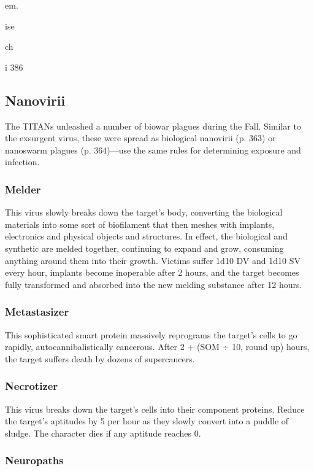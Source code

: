 em. 

ise

ch 

i
386

\subsection{Nanovirii}

The TITANs unleashed a number of biowar plagues 
during the Fall. Similar to the exsurgent virus, these 
were spread as biological nanovirii (p. 363) or nanoswarm
plagues (p. 364)—use the same rules for determining
exposure and infection.

\subsubsection{Melder}

This virus slowly breaks down the target's body, 
converting the biological materials into some sort of 
biofilament that then meshes with implants, electronics
and physical objects and structures. In effect, the
biological and synthetic are melded together, continuing
to expand and grow, consuming anything around
them into their growth. Victims suffer 1d10 DV and 
1d10 SV every hour, implants become inoperable after 
2 hours, and the target becomes fully transformed 
and absorbed into the new melding substance after 
12 hours. 

\subsubsection{Metastasizer}

This sophisticated smart protein massively reprograms 
the target's cells to go rapidly, autocannibalistically 
cancerous. After 2 + (SOM ÷ 10, round up) hours, the 
target suffers death by dozens of supercancers.

\subsubsection{Necrotizer}

This virus breaks down the target's cells into their 
component proteins. Reduce the target's aptitudes by 
5 per hour as they slowly convert into a puddle of 
sludge. The character dies if any aptitude reaches 0.

\subsubsection{Neuropaths}

